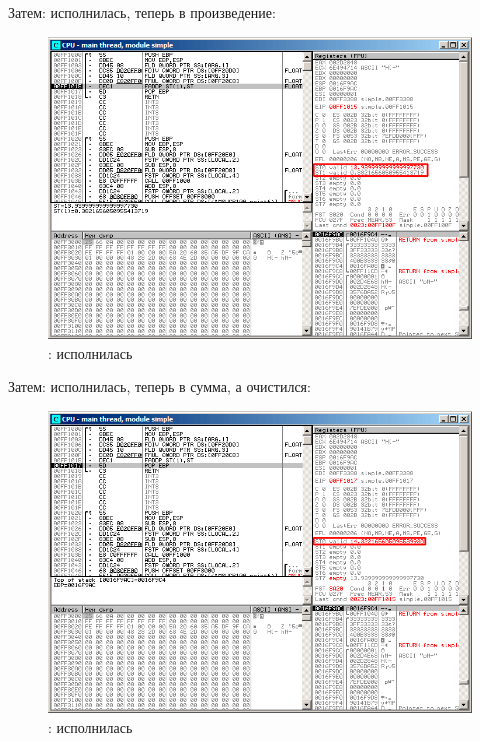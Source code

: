 \clearpage
Затем: \FMUL исполнилась, теперь в  произведение:

\begin{figure}[H]
\centering
\includegraphics[scale=\FigScale]{patterns/12_FPU/1_simple/olly4.png}
\caption{\olly: \FMUL исполнилась}
\label{fig:FPU_simple_olly_4}
\end{figure}

\clearpage
Затем: \FADDP исполнилась, теперь в  сумма, а  очистился:

\begin{figure}[H]
\centering
\includegraphics[scale=\FigScale]{patterns/12_FPU/1_simple/olly5.png}
\caption{\olly: \FADDP исполнилась}
\label{fig:FPU_simple_olly_5}
\end{figure}

